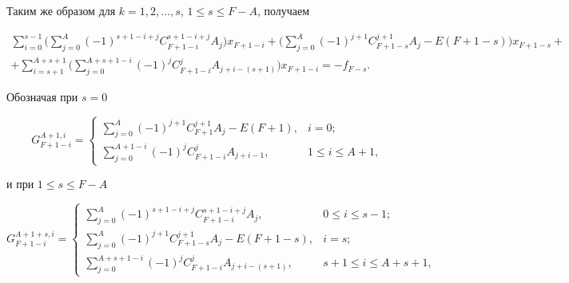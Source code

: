 Таким же образом для $k=1,2,\dotsc,s$, $1\leq s\leq F-A$, получаем


\begin{multline}


\sum_{i=0}^{s-1}


\bigg(\sum_{j=0}^{A}(-1)^{s+1-i+j}C_{F+1-i}^{s+1-i+j}A_{j}\bigg)x_{F+1-i}


+\bigg(\sum_{j=0}^{A}(-1)^{j+1}C_{F+1-s}^{j+1}A_{j}


-E(F+1-s)\bigg)x_{F+1-s} +\\


%


+\sum_{i=s+1}^{A+s+1}


\bigg(\sum_{j=0}^{A+s+1-i}(-1)^{j}


C_{F+1-i}^{j}A_{j+i-(s+1)}\bigg)x_{F+1-i}=-f_{F-s}.


\end{multline}


Обозначая при $s=0$


\begin{equation}


G_{F+1-i}^{A+1,i}=


\begin{cases}


\sum\limits_{j=0}^{A}(-1)^{j+1}C_{F+1}^{j+1}A_{j}-E(F+1), & i=0; \\


\sum\limits_{j=0}^{A+1-i}(-1)^{j}C_{F+1-i}^{j}A_{j+i-1}, &


1\leq i \leq A+1,


\end{cases}


\end{equation}


и при $1\leq s\leq F-A$


\begin{equation}


G_{F+1-i}^{A+1+s,i}=


\begin{cases}


\sum\limits_{j=0}^{A}(-1)^{s+1-i+j}C_{F+1-i}^{s+1-i+j}A_{j}, &


0\leq i \leq s-1; \\


\sum\limits_{j=0}^{A}(-1)^{j+1}C_{F+1-s}^{j+1}A_{j}-E(F+1-s), & i=s; \\


\sum\limits_{j=0}^{A+s+1-i}(-1)^{j}C_{F+1-i}^{j}A_{j+i-(s+1)}, &


s+1\leq i \leq A+s+1,


\end{cases}


\end{equation}


